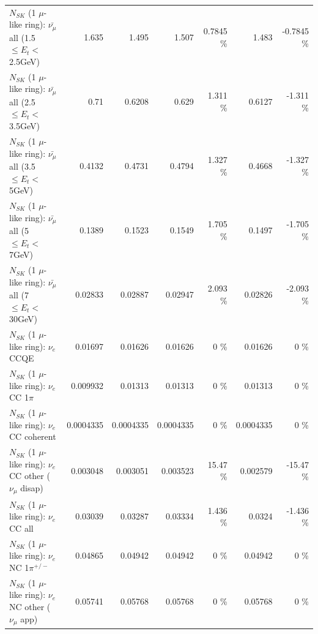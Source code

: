 \begin{table}
\begin{tabular}{| l | r | r | r  r | r  r |}
 $N_{SK}$ (1 $\mu$-like ring): $\bar{\nu_{\mu}}$ all (1.5 $\leq E_{t} <$ 2.5GeV) &           1.635 &           1.495 &           1.507 &   0.7845 \%  &           1.483 &  -0.7845 \%  \\ 
 $N_{SK}$ (1 $\mu$-like ring): $\bar{\nu_{\mu}}$ all (2.5 $\leq E_{t} <$ 3.5GeV) &            0.71 &          0.6208 &           0.629 &    1.311 \%  &          0.6127 &   -1.311 \%  \\ 
   $N_{SK}$ (1 $\mu$-like ring): $\bar{\nu_{\mu}}$ all (3.5 $\leq E_{t} <$ 5GeV) &          0.4132 &          0.4731 &          0.4794 &    1.327 \%  &          0.4668 &   -1.327 \%  \\ 
     $N_{SK}$ (1 $\mu$-like ring): $\bar{\nu_{\mu}}$ all (5 $\leq E_{t} <$ 7GeV) &          0.1389 &          0.1523 &          0.1549 &    1.705 \%  &          0.1497 &   -1.705 \%  \\ 
    $N_{SK}$ (1 $\mu$-like ring): $\bar{\nu_{\mu}}$ all (7 $\leq E_{t} <$ 30GeV) &         0.02833 &         0.02887 &         0.02947 &    2.093 \%  &         0.02826 &   -2.093 \%  \\ 
\hline
\hline
\hline
                                      $N_{SK}$ (1 $\mu$-like ring): $\nu_e$ CCQE &         0.01697 &         0.01626 &         0.01626 &        0 \%  &         0.01626 &        0 \%  \\ 
                                 $N_{SK}$ (1 $\mu$-like ring): $\nu_e$ CC 1$\pi$ &        0.009932 &         0.01313 &         0.01313 &        0 \%  &         0.01313 &        0 \%  \\ 
                               $N_{SK}$ (1 $\mu$-like ring): $\nu_e$ CC coherent &       0.0004335 &       0.0004335 &       0.0004335 &        0 \%  &       0.0004335 &        0 \%  \\ 
                $N_{SK}$ (1 $\mu$-like ring): $\nu_e$ CC other ($\nu_\mu$ disap) &        0.003048 &        0.003051 &        0.003523 &    15.47 \%  &        0.002579 &   -15.47 \%  \\ 
                                  $N_{SK}$ (1 $\mu$-like ring): $\nu_{e}$ CC all &         0.03039 &         0.03287 &         0.03334 &    1.436 \%  &          0.0324 &   -1.436 \%  \\ 
\hline
                           $N_{SK}$ (1 $\mu$-like ring): $\nu_e$ NC 1$\pi^{+/-}$ &         0.04865 &         0.04942 &         0.04942 &        0 \%  &         0.04942 &        0 \%  \\ 
                  $N_{SK}$ (1 $\mu$-like ring): $\nu_e$ NC other ($\nu_\mu$ app) &         0.05741 &         0.05768 &         0.05768 &        0 \%  &         0.05768 &        0 \%  \\ 

\end{tabular}
\end{table}
